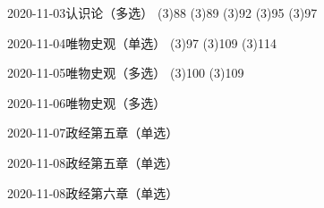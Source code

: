 \documentclass{ctexart}
\begin{document}
\begin{sdpolitics}{2020-11-03}{认识论（多选）}
  \addto[2020-11-06](3){88}
  \addto[2020-11-06](3){89}
  \addto[2020-11-06](3){92}
  \addto[2020-11-06](3){95}
  \addto[2020-11-06](3){97}
\end{sdpolitics}

\begin{sdpolitics}{2020-11-04}{唯物史观（单选）}
  \addto[2020-11-06](3){97}
  \addto[2020-11-06](3){109}
  \addto[2020-11-06](3){114}
\end{sdpolitics}

\begin{sdpolitics}{2020-11-05}{唯物史观（多选）}
  \addto[2020-11-06](3){100}
  \addto[2020-11-06](3){109}
\end{sdpolitics}

\begin{sdpolitics}{2020-11-06}{唯物史观（多选）}
\end{sdpolitics}

\begin{sdpolitics}{2020-11-07}{政经第五章（单选）}
\end{sdpolitics}

\begin{sdpolitics}{2020-11-08}{政经第五章（单选）}
\end{sdpolitics}

\begin{sdpolitics}{2020-11-08}{政经第六章（单选）}
\end{sdpolitics}
\end{document}
